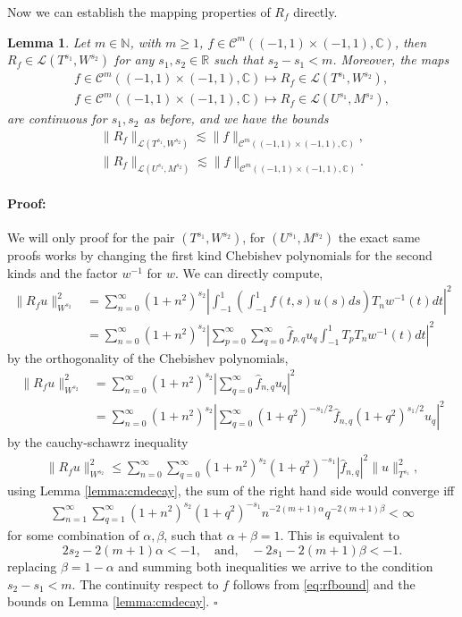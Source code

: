 \documentclass{article}
\newtheorem{lemma}[theorem]{Lemma}
\newenvironment{proof}{\paragraph{Proof:}}{\hfill$\square$}
\newcommand{\IC}{{\mathbb C}}
\newcommand{\IN}{{\mathbb N}}
\newcommand{\IR}{{\mathbb R}}
\newcommand{\cmspace}[3]{\mathcal{C}^{#1} \left( #2, #3 \right)}
\newcommand{\iinterv}{(-1,1)\times(-1,1)}
\begin{document}
Now we can establish the mapping properties of $R_f$ directly. 
\begin{lemma}
\label{lemma:Rfoperator}
Let $m \in \IN$, with $m\geq 1$, $f \in \cmspace{m}{\iinterv}{\IC}$, then $R_f \in \mathcal{L}(T^{s_1}, W^{s_2})$ for any $s_1,s_2 \in \IR$ such that $s_2 -s_1 < m$. Moreover, the maps
\begin{align*}
f \in \cmspace{m}{\iinterv}{\IC} \mapsto R_f \in \mathcal{L}(T^{s_1}, W^{s_2}),\\
f \in \cmspace{m}{\iinterv}{\IC} \mapsto R_f \in \mathcal{L}(U^{s_1}, M^{s_2}),
\end{align*}  are continuous for $s_1, s_2$ as before, and we have the bounds 
\begin{align*}
\| R_f \|_{\mathcal{L}(T^{s_1}, W^{s_2})} \lesssim \| f\|_{\cmspace{m}{\iinterv}{\IC}},\\
\| R_f \|_{\mathcal{L}(U^{s_1}, M^{s_2})} \lesssim \| f\|_{\cmspace{m}{\iinterv}{\IC}}.
\end{align*}
\end{lemma}
\begin{proof}
We will only proof for the pair $(T^{s_1},W^{s_2})$, for $(U^{s_1},M^{s_2})$ the exact same proofs works by changing the first kind Chebishev polynomials for the second kinds and the factor $w^{-1}$ for $w$. We can directly compute,
\begin{align*}
\|R_fu\|_{W^{s_2}}^2  &= \sum_{n=0}^\infty (1+n^2)^{s_2} \left\vert 
\int_{-1}^1 \left( \int_{-1}^1 f(t,s) u(s) ds\right) T_n w^{-1}(t) dt\right\vert^2\\
& = 
\sum_{n=0}^\infty (1+n^2)^{s_2} \left\vert  \sum_{p=0}^\infty \sum_{q=0}^\infty \widehat{f}_{p,q} u_q
\int_{-1}^1 T_p   T_n w^{-1}(t) dt \right\vert^2
\end{align*} 
by the orthogonality of the Chebishev polynomials,
 \begin{align*}
\|R_fu\|_{W^{s_2}}^2  &=
\sum_{n=0}^\infty (1+n^2)^{s_2} \left\vert   \sum_{q=0}^\infty \widehat{f}_{n,q} u_q
 \right\vert^2 
 \\
 &= 
\sum_{n=0}^\infty (1+n^2)^{s_2} \left\vert   \sum_{q=0}^\infty (1+q^2)^{-s_1/2}\widehat{f}_{n,q} (1 +q^2)^{s_1/2}u_q
 \right\vert^2  
\end{align*} 
by the cauchy-schawrz inequality 
\begin{align}
\label{eq:rfbound}
\|R_fu\|_{W^{s_2}}^2  \leq 
\sum_{n=0}^\infty \sum_{q=0}^\infty (1+n^2)^{s_2}     (1+q^2)^{-s_1}|\widehat{f}_{n,q}|^2  \| u\|^2_{T^{s_1}},
\end{align}
using Lemma \ref{lemma:cmdecay}, the sum of the right hand side would converge iff
\begin{align*}
\sum_{n=1}^\infty \sum_{q=1}^\infty (1+n^2)^{s_2}     (1+q^2)^{-s_1} n^{-2(m+1)\alpha} q^{-2(m+1)\beta} < \infty
\end{align*}
for some combination of $\alpha,\beta$, such that $\alpha + \beta = 1$. This is equivalent to 
$$2s_2 -2(m+1)\alpha < -1, \quad \text{and,} \quad -2s_1 -2(m+1)\beta < -1. $$
replacing $\beta = 1 - \alpha$ and summing both inequalities we arrive to the condition $s_2-s_1 < m$.  The continuity respect to $f$ follows from   \eqref{eq:rfbound} and the bounds on Lemma \ref{lemma:cmdecay}.
\end{proof}
\end{document}
